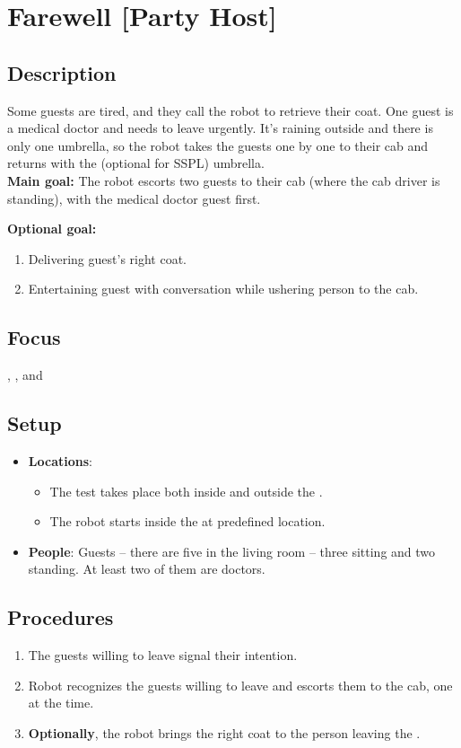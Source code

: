 \section{Farewell [Party Host]}
\label{test:farewell}

\subsection*{Description}
    Some guests are tired, and they call the robot to retrieve their coat. One guest is a medical doctor and needs to leave urgently. 
    It's raining outside and there is only one umbrella, so the robot takes the guests one by one to their cab and returns 
    with the (optional for SSPL) umbrella.\\


\textbf{Main goal:}
The robot escorts two guests to their cab (where the cab driver is standing), with the medical doctor guest first.


\textbf{Optional goal:}
\begin{enumerate}[nosep]
	\item Delivering guest's right coat.
	\item Entertaining guest with conversation while ushering person to the cab.
\end{enumerate}

\subsection*{Focus}
\PerDet{}, \NAV{}, and \HRI{}

\subsection*{Setup}
\begin{itemize}
	\item \textbf{Locations}: 
		\begin{itemize}
		 \item The test takes place both inside and outside the \Arena{}.
		 \item The robot starts inside the \Arena{} at predefined location.
		\end{itemize}
	\item \textbf{People}: Guests -- there are five  in the living room -- three sitting and two standing. At least two of them are doctors.
\end{itemize}

\subsection*{Procedures}
\begin{enumerate}
	\item The guests willing to leave signal their intention.
	\item Robot recognizes the guests willing to leave and escorts them to the cab, one at the time.
	\item \textbf{Optionally}, the robot brings the right coat to the person leaving the \Arena{}.
\end{enumerate}

